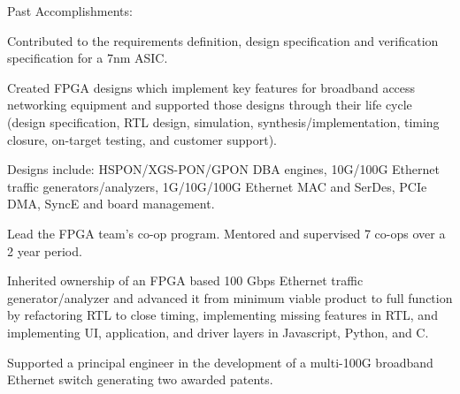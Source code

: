 \documentclass[10pt]{deedy-resume-reversed}
\begin{document}
\begin{minipage}[t]{1.0\textwidth}
\newline
{}
Past Accomplishments:
\vspace{\topsep} %
\begin{tightemize}
\item Contributed to the requirements definition, design specification and verification specification for a 7nm ASIC.
\item Created FPGA designs which implement key features for broadband access networking equipment and
supported those designs through their life cycle (design specification, RTL design, simulation,
synthesis/implementation, timing closure, on-target testing, and customer support).
\item Designs include: HSPON/XGS-PON/GPON DBA engines, 10G/100G Ethernet traffic generators/analyzers,
1G/10G/100G Ethernet MAC and SerDes, PCIe DMA, SyncE and board management.
\item Lead the FPGA team's co-op program. Mentored and supervised 7 co-ops over a 2 year period.
\item Inherited ownership of an FPGA based 100 Gbps Ethernet traffic generator/analyzer and advanced it
from minimum viable product to full function by refactoring RTL to close timing, implementing missing features
in RTL, and implementing UI, application, and driver layers in Javascript, Python, and C.
\item Supported a principal engineer in the development of a multi-100G broadband Ethernet switch generating two awarded patents.

\end{tightemize}
\end{minipage}
\end{document}
